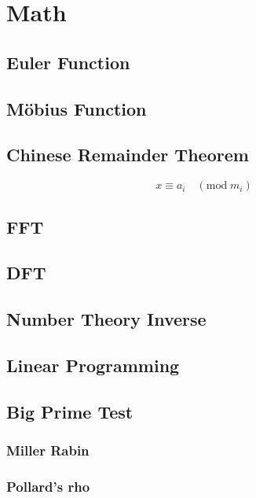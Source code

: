 \section{Math}

\subsection{Euler Function}


\subsection{Möbius Function}


\subsection{Chinese Remainder Theorem}
\[
	x \equiv a_i \quad (\mathrm{mod}\;m_i)
\]


\subsection{FFT}


\subsection{DFT}

\subsection{Number Theory Inverse}


\subsection{Linear Programming}


\subsection{Big Prime Test}

\subsubsection{Miller Rabin}

\subsubsection{Pollard's rho}

